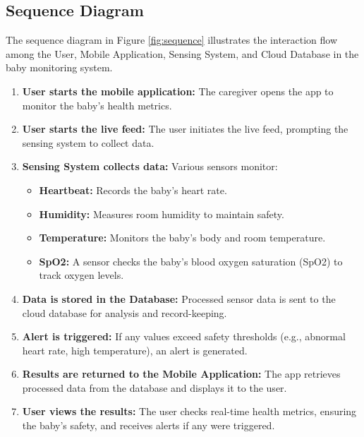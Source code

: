 \documentclass[12pt,a4paper]{report}
\begin{document}
\subsection{Sequence Diagram}
The sequence diagram in Figure \ref{fig:sequence} illustrates the interaction flow among the User, Mobile Application, Sensing System, and Cloud Database in the baby monitoring system.

\begin{enumerate}
  \item \textbf{User starts the mobile application:} The caregiver opens the app to monitor the baby’s health metrics.
  \item \textbf{User starts the live feed:} The user initiates the live feed, prompting the sensing system to collect data.
  \item \textbf{Sensing System collects data:} Various sensors monitor:
  \begin{itemize}
    \item \textbf{Heartbeat:} Records the baby’s heart rate.
    \item \textbf{Humidity:} Measures room humidity to maintain safety.
    \item \textbf{Temperature:} Monitors the baby's body and room temperature.
  \item \textbf{SpO2:} A sensor checks the baby’s blood oxygen saturation (SpO2) to track oxygen levels.
  \end{itemize}
  \item \textbf{Data is stored in the Database:} Processed sensor data is sent to the cloud database for analysis and record-keeping.
  \item \textbf{Alert is triggered:} If any values exceed safety thresholds (e.g., abnormal heart rate, high temperature), an alert is generated.
  \item \textbf{Results are returned to the Mobile Application:} The app retrieves processed data from the database and displays it to the user.
  \item \textbf{User views the results:} The user checks real-time health metrics, ensuring the baby's safety, and receives alerts if any were triggered.
\end{enumerate}
\end{document}
